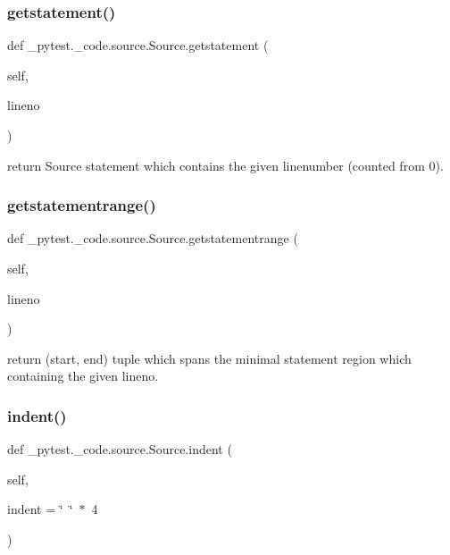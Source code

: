 \subsubsection{\texorpdfstring{getstatement()}{getstatement()}}
{\footnotesize\ttfamily def \+\_\+pytest.\+\_\+code.\+source.\+Source.\+getstatement (\begin{DoxyParamCaption}\item[{}]{self,  }\item[{}]{lineno }\end{DoxyParamCaption})}

\begin{DoxyVerb}return Source statement which contains the
    given linenumber (counted from 0).
\end{DoxyVerb}
 \mbox{\label{class__pytest_1_1__code_1_1source_1_1_source_a922e58f496eeacb6b757d222c5836c25}} 
\subsubsection{\texorpdfstring{getstatementrange()}{getstatementrange()}}
{\footnotesize\ttfamily def \+\_\+pytest.\+\_\+code.\+source.\+Source.\+getstatementrange (\begin{DoxyParamCaption}\item[{}]{self,  }\item[{}]{lineno }\end{DoxyParamCaption})}

\begin{DoxyVerb}return (start, end) tuple which spans the minimal
    statement region which containing the given lineno.
\end{DoxyVerb}
 \mbox{\label{class__pytest_1_1__code_1_1source_1_1_source_a24be56f21f626ab1028e982244738ec6}} 
\subsubsection{\texorpdfstring{indent()}{indent()}}
{\footnotesize\ttfamily def \+\_\+pytest.\+\_\+code.\+source.\+Source.\+indent (\begin{DoxyParamCaption}\item[{}]{self,  }\item[{}]{indent = {\ttfamily \char`\"{}~\char`\"{}~$\ast$~4} }\end{DoxyParamCaption})}

